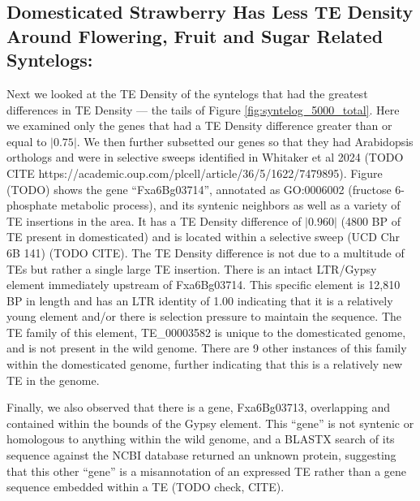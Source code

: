 \documentclass[fleqn,10pt]{olplainarticle}
\begin{document}


\subsection{Domesticated Strawberry Has Less TE Density Around Flowering, Fruit and Sugar Related Syntelogs:}
Next we looked at the TE Density of the syntelogs that had the greatest differences in TE Density --- the tails of Figure \ref{fig:syntelog_5000_total}.
Here we examined only the genes that had a TE Density difference greater than or equal to $\lvert 0.75 \rvert$.
We then further subsetted our genes so that they had Arabidopsis orthologs and were in selective sweeps identified in Whitaker et al 2024 (TODO CITE https://academic.oup.com/plcell/article/36/5/1622/7479895).
Figure (TODO) shows the gene ``Fxa6Bg03714'', annotated as GO:0006002 (fructose 6-phosphate metabolic process), and its syntenic neighbors as well as a variety of TE insertions in the area.
It has a TE Density difference of $\lvert 0.960 \rvert$ (4800 BP of TE present in domesticated) and is located within a selective sweep (UCD Chr 6B 141) (TODO CITE).
The TE Density difference is not due to a multitude of TEs but rather a single large TE insertion.
There is an intact LTR/Gypsy element immediately upstream of Fxa6Bg03714.
This specific element is 12,810 BP in length and has an LTR identity of 1.00 indicating that it is a relatively young element and/or there is selection pressure to maintain the sequence.
The TE family of this element, TE\_00003582 is unique to the domesticated genome, and is not present in the wild genome.
There are 9 other instances of this family within the domesticated genome, further indicating that this is a relatively new TE in the genome.


Finally, we also observed that there is a gene, Fxa6Bg03713, overlapping and contained within the bounds of the Gypsy element.
This ``gene'' is not syntenic or homologous to anything within the wild genome, and a BLASTX search of its sequence against the NCBI database returned an unknown protein, suggesting that this other ``gene'' is a misannotation of an expressed TE rather than a gene sequence embedded within a TE (TODO check, CITE).
\end{document}
